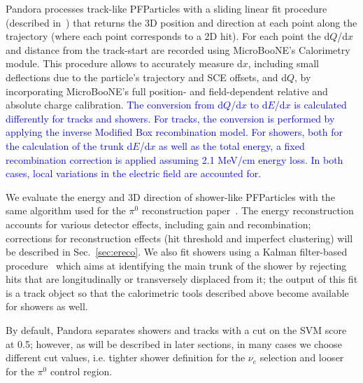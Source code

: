 \documentclass[a4paper]{article}
\begin{document}
Pandora processes track-like PFParticles with a sliding linear fit procedure (described in~\cite{bib:pandoraub}) that returns the 3D position and direction at each point along the trajectory (where each point corresponds to a 2D hit). For each point the d$Q$/d$x$ and distance from the track-start are recorded using MicroBooNE's Calorimetry module. This procedure allows to accurately measure d$x$, including small deflections due to the particle's trajectory and SCE offsets, and d$Q$, by incorporating MicroBooNE's full position- and field-dependent relative and absolute charge calibration. \textcolor{blue}{The conversion from d$Q$/d$x$ to d$E$/d$x$ is calculated differently for tracks and showers. For tracks, the conversion is performed by applying the inverse Modified Box recombination model. For showers, both for the calculation of the trunk d$E$/d$x$ as well as the total energy, a fixed recombination correction is applied assuming 2.1 MeV/cm energy loss. In both cases, local variations in the electric field are accounted for.}

We evaluate the energy and 3D direction of shower-like PFParticles with the same algorithm used for the $\pi^0$ reconstruction paper~\cite{bib:pi0reco}. The energy reconstruction accounts for various detector effects, including gain and recombination; corrections for reconstruction effects (hit threshold and imperfect clustering) will be described in Sec.~\ref{sec:ereco}. We also fit showers using a Kalman filter-based procedure~\cite{bib:shrtrackfitter} which aims at identifying the main trunk of the shower by rejecting hits that are longitudinally or transversely displaced from it; the output of this fit is a track object so that the calorimetric tools described above become available for showers as well.

By default, Pandora separates showers and tracks with a cut on the SVM score at 0.5; however, as will be described in later sections, in many cases we choose different cut values, i.e. tighter shower definition for the $\nu_e$ selection and looser for the $\pi^0$ control region.
\end{document}
